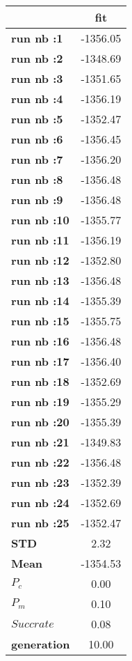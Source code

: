\begin{tiny}\begin{tabular}{|l|c|}
\hline
&\textbf{fit}\\\hline
\textbf{run nb :1}&-1356.05\\\hline
\textbf{run nb :2}&-1348.69\\\hline
\textbf{run nb :3}&-1351.65\\\hline
\textbf{run nb :4}&-1356.19\\\hline
\textbf{run nb :5}&-1352.47\\\hline
\textbf{run nb :6}&-1356.45\\\hline
\textbf{run nb :7}&-1356.20\\\hline
\textbf{run nb :8}&-1356.48\\\hline
\textbf{run nb :9}&-1356.48\\\hline
\textbf{run nb :10}&-1355.77\\\hline
\textbf{run nb :11}&-1356.19\\\hline
\textbf{run nb :12}&-1352.80\\\hline
\textbf{run nb :13}&-1356.48\\\hline
\textbf{run nb :14}&-1355.39\\\hline
\textbf{run nb :15}&-1355.75\\\hline
\textbf{run nb :16}&-1356.48\\\hline
\textbf{run nb :17}&-1356.40\\\hline
\textbf{run nb :18}&-1352.69\\\hline
\textbf{run nb :19}&-1355.29\\\hline
\textbf{run nb :20}&-1355.39\\\hline
\textbf{run nb :21}&-1349.83\\\hline
\textbf{run nb :22}&-1356.48\\\hline
\textbf{run nb :23}&-1352.39\\\hline
\textbf{run nb :24}&-1352.69\\\hline
\textbf{run nb :25}&-1352.47\\\hline
\textbf{STD}&2.32\\\hline
\textbf{Mean}&-1354.53\\\hline
\textbf{$P_c$}&0.00\\\hline
\textbf{$P_{m}$}&0.10\\\hline
\textbf{$Succ rate$}&0.08\\\hline
\textbf{generation}&10.00\\\hline
\end{tabular}
\end{tiny}